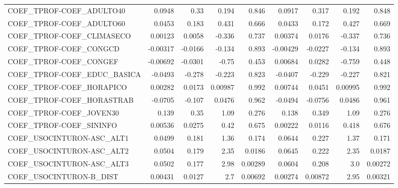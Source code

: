 \begin{tabular}{lrrrrrrrr}
COEF\_TPROF-COEF\_ADULTO40          &      0.0948 &         0.33 &   0.194 &    0.846 &     0.0917 &       0.317 &        0.192 &         0.848 \\
COEF\_TPROF-COEF\_ADULTO60          &      0.0453 &        0.183 &   0.431 &    0.666 &     0.0433 &       0.172 &        0.427 &         0.669 \\
COEF\_TPROF-COEF\_CLIMASECO         &     0.00123 &       0.0058 &  -0.336 &    0.737 &    0.00374 &      0.0176 &       -0.337 &         0.736 \\
COEF\_TPROF-COEF\_CONGCD            &    -0.00317 &      -0.0166 &  -0.134 &    0.893 &   -0.00429 &     -0.0227 &       -0.134 &         0.893 \\
COEF\_TPROF-COEF\_CONGEF            &    -0.00692 &      -0.0301 &   -0.75 &    0.453 &    0.00684 &      0.0282 &       -0.759 &         0.448 \\
COEF\_TPROF-COEF\_EDUC\_BASICA       &     -0.0493 &       -0.278 &  -0.223 &    0.823 &    -0.0407 &      -0.229 &       -0.227 &         0.821 \\
COEF\_TPROF-COEF\_HORAPICO          &     0.00282 &       0.0173 & 0.00987 &    0.992 &    0.00744 &      0.0451 &      0.00995 &         0.992 \\
COEF\_TPROF-COEF\_HORASTRAB         &     -0.0705 &       -0.107 &  0.0476 &    0.962 &    -0.0494 &     -0.0756 &       0.0486 &         0.961 \\
COEF\_TPROF-COEF\_JOVEN30           &       0.139 &         0.35 &    1.09 &    0.276 &      0.138 &       0.349 &         1.09 &         0.276 \\
COEF\_TPROF-COEF\_SININFO           &     0.00536 &       0.0275 &    0.42 &    0.675 &    0.00222 &      0.0116 &        0.418 &         0.676 \\
COEF\_USOCINTURON-ASC\_ALT1         &      0.0499 &        0.181 &    1.36 &    0.174 &     0.0644 &       0.227 &         1.37 &         0.171 \\
COEF\_USOCINTURON-ASC\_ALT2         &      0.0504 &        0.179 &    2.35 &   0.0186 &     0.0645 &       0.222 &         2.35 &        0.0187 \\
COEF\_USOCINTURON-ASC\_ALT3         &      0.0502 &        0.177 &    2.98 &  0.00289 &     0.0604 &       0.208 &          3.0 &       0.00272 \\
COEF\_USOCINTURON-B\_DIST           &     0.00431 &       0.0127 &     2.7 &  0.00692 &    0.00274 &     0.00872 &         2.95 &       0.00321 \\

\end{tabular}
